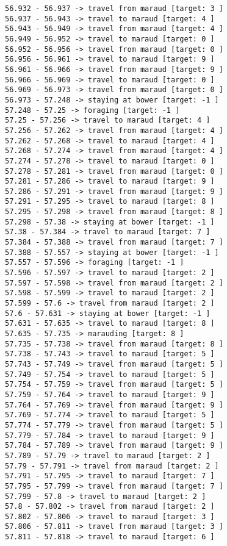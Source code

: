 \documentclass[11pt]{article}
\begin{document}
\begin{Verbatim}[commandchars=\\\{\}]
56.932 - 56.937 -> travel from maraud [target: 3 ]
56.937 - 56.943 -> travel to maraud [target: 4 ]
56.943 - 56.949 -> travel from maraud [target: 4 ]
56.949 - 56.952 -> travel to maraud [target: 0 ]
56.952 - 56.956 -> travel from maraud [target: 0 ]
56.956 - 56.961 -> travel to maraud [target: 9 ]
56.961 - 56.966 -> travel from maraud [target: 9 ]
56.966 - 56.969 -> travel to maraud [target: 0 ]
56.969 - 56.973 -> travel from maraud [target: 0 ]
56.973 - 57.248 -> staying at bower [target: -1 ]
57.248 - 57.25 -> foraging [target: -1 ]
57.25 - 57.256 -> travel to maraud [target: 4 ]
57.256 - 57.262 -> travel from maraud [target: 4 ]
57.262 - 57.268 -> travel to maraud [target: 4 ]
57.268 - 57.274 -> travel from maraud [target: 4 ]
57.274 - 57.278 -> travel to maraud [target: 0 ]
57.278 - 57.281 -> travel from maraud [target: 0 ]
57.281 - 57.286 -> travel to maraud [target: 9 ]
57.286 - 57.291 -> travel from maraud [target: 9 ]
57.291 - 57.295 -> travel to maraud [target: 8 ]
57.295 - 57.298 -> travel from maraud [target: 8 ]
57.298 - 57.38 -> staying at bower [target: -1 ]
57.38 - 57.384 -> travel to maraud [target: 7 ]
57.384 - 57.388 -> travel from maraud [target: 7 ]
57.388 - 57.557 -> staying at bower [target: -1 ]
57.557 - 57.596 -> foraging [target: -1 ]
57.596 - 57.597 -> travel to maraud [target: 2 ]
57.597 - 57.598 -> travel from maraud [target: 2 ]
57.598 - 57.599 -> travel to maraud [target: 2 ]
57.599 - 57.6 -> travel from maraud [target: 2 ]
57.6 - 57.631 -> staying at bower [target: -1 ]
57.631 - 57.635 -> travel to maraud [target: 8 ]
57.635 - 57.735 -> marauding [target: 8 ]
57.735 - 57.738 -> travel from maraud [target: 8 ]
57.738 - 57.743 -> travel to maraud [target: 5 ]
57.743 - 57.749 -> travel from maraud [target: 5 ]
57.749 - 57.754 -> travel to maraud [target: 5 ]
57.754 - 57.759 -> travel from maraud [target: 5 ]
57.759 - 57.764 -> travel to maraud [target: 9 ]
57.764 - 57.769 -> travel from maraud [target: 9 ]
57.769 - 57.774 -> travel to maraud [target: 5 ]
57.774 - 57.779 -> travel from maraud [target: 5 ]
57.779 - 57.784 -> travel to maraud [target: 9 ]
57.784 - 57.789 -> travel from maraud [target: 9 ]
57.789 - 57.79 -> travel to maraud [target: 2 ]
57.79 - 57.791 -> travel from maraud [target: 2 ]
57.791 - 57.795 -> travel to maraud [target: 7 ]
57.795 - 57.799 -> travel from maraud [target: 7 ]
57.799 - 57.8 -> travel to maraud [target: 2 ]
57.8 - 57.802 -> travel from maraud [target: 2 ]
57.802 - 57.806 -> travel to maraud [target: 3 ]
57.806 - 57.811 -> travel from maraud [target: 3 ]
57.811 - 57.818 -> travel to maraud [target: 6 ]

\end{Verbatim}
\end{document}
